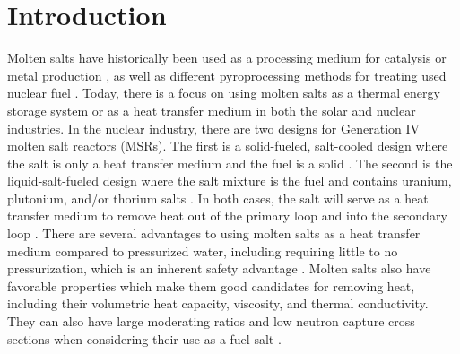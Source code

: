 \documentclass[review]{elsarticle}
\begin{document}

\section{Introduction}
Molten salts have historically been used as a processing medium for catalysis \cite{JIN20202382, HU20204244} or metal production \cite{Zhu2014, VAHIDI2018178}, as well as different pyroprocessing methods for treating used nuclear fuel \cite{CHOI2015572, osti_22107867}. Today, there is a focus on using molten salts as a thermal energy storage system or as a heat transfer medium in both the solar and nuclear industries. In the nuclear industry, there are two designs for Generation IV molten salt reactors (MSRs). The first is a solid-fueled, salt-cooled design where the salt is only a heat transfer medium and the fuel is a solid \cite{doi:10.13182/NSE90-374}. The second is the liquid-salt-fueled design where the salt mixture is the fuel and contains uranium, plutonium, and/or thorium salts \cite{doi:10.1080/00295450.2019.1586372}. In both cases, the salt will serve as a heat transfer medium to remove heat out of the primary loop and into the secondary loop \cite{gakhar2021molten}. There are several advantages to using molten salts as a heat transfer medium compared to pressurized water, including requiring little to no pressurization, which is an inherent safety advantage \cite{leblanc2017integral}. Molten salts also have favorable properties which make them good candidates for removing heat, including their volumetric heat capacity, viscosity, and thermal conductivity. They can also have large moderating ratios and low neutron capture cross sections when considering their use as a fuel salt \cite{williams2006assessment}.
\end{document}
